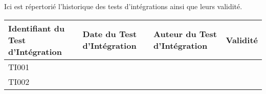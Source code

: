 
Ici est répertorié l'historique des tests d'intégrations ainsi que leurs validité. \\

\begin{table}[H]
\centering
	\begin{tabularx}{17.4cm}{|X|X|X|X|}
	\hline
	\rowcolor{gray!40} Identifiant du Test d'Intégration & Date du Test d'Intégration & Auteur du Test d'Intégration & Validité\\
	\hline
	 TI001 &  & & \\
	\hline
	 TI002 &  & & \\
	\hline
	\end{tabularx}
\end{table}

